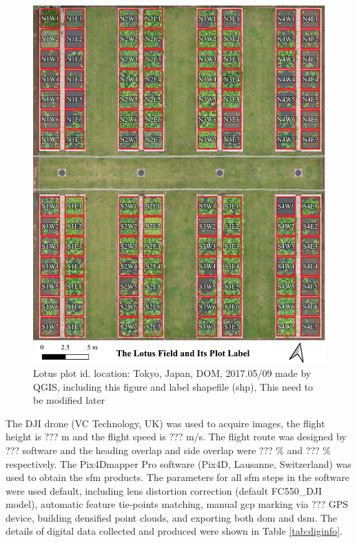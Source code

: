 \documentclass[sensors,article,submit,moreauthors, xelatex]{Definitions/mdpi}
\begin{document}
\begin{figure}[H]
  \centering
  \includegraphics[width=0.95\linewidth]{figures/plot_with_id.pdf}
  \caption{Lotus plot id. location: Tokyo, Japan, DOM, 2017.05/09 made by QGIS, including this figure and label shapefile (shp), This need to be modified later}
  \label{fig:plotid}
\end{figure}

The DJI drone (VC Technology, UK) was used to acquire images, the flight height is ??? m and the flight speed is ??? m/s. The flight route was designed by ??? software and the heading overlap and side overlap were ??? \% and ??? \% respectively. The Pix4Dmapper Pro software (Pix4D, Lausanne, Switzerland) was used to obtain the \acrshort*{sfm} products. The parameters for all \acrshort*{sfm} steps in the software were used default, including lens distortion correction (default FC550\_DJI model), automatic feature tie-points matching, manual \acrfull*{gcp} marking via ??? GPS device, building densified point clouds, and exporting both \acrshort*{dom} and \acrshort*{dsm}. The details of digital data collected and produced were shown in Table \ref{tab:diginfo}.
\end{document}
